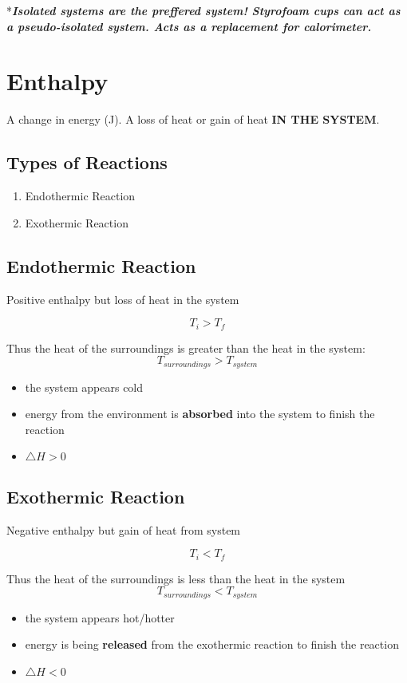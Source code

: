 \documentclass[12pt]{article} %
\begin{document}
*\textit{\textbf{Isolated systems are the preffered system! Styrofoam cups can act as a pseudo-isolated system. Acts as a replacement for calorimeter.}}

\pagebreak

\singlespace

\section{Enthalpy}

A change in energy (J). A loss of heat or gain of heat \textbf{IN THE SYSTEM}.

\subsection{Types of Reactions}
\begin{enumerate}
\item Endothermic Reaction
\item Exothermic Reaction
\end{enumerate}

\subsection{Endothermic Reaction}
Positive enthalpy but loss of heat in the system

$$T_i > T_f$$

Thus the heat of the surroundings is greater than the heat in the system: 
$$T_{surroundings} > T_{system}$$

\singlespace
\begin{itemize}
\item the system appears cold
\item energy from the environment is \textbf{absorbed} into the system to finish the reaction
\item $\triangle{H} > 0$
\end{itemize}

\subsection{Exothermic Reaction}
Negative enthalpy but gain of heat from system

$$T_i < T_f$$

Thus the heat of the surroundings is less than the heat in the system
$$T_{surroundings} < T_{system}$$

\singlespace
\begin{itemize}
\item the system appears hot/hotter
\item energy is being \textbf{released} from the exothermic reaction to finish the reaction
\item $\triangle{H} < 0$
\end{itemize}
\end{document}
